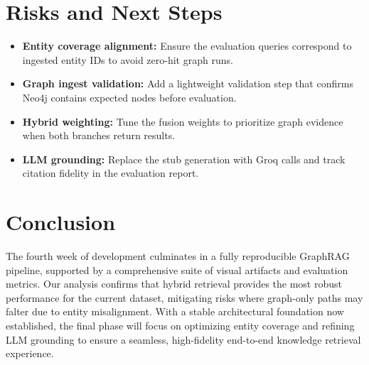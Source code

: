 \documentclass[11pt,a4paper]{article}
\begin{document}
\section{Risks and Next Steps}
\begin{itemize}
    \item \textbf{Entity coverage alignment:} Ensure the evaluation queries correspond to ingested entity IDs to avoid zero-hit graph runs.
    \item \textbf{Graph ingest validation:} Add a lightweight validation step that confirms Neo4j contains expected nodes before evaluation.
    \item \textbf{Hybrid weighting:} Tune the fusion weights to prioritize graph evidence when both branches return results.
    \item \textbf{LLM grounding:} Replace the stub generation with Groq calls and track citation fidelity in the evaluation report.
\end{itemize}

\section{Conclusion}
The fourth week of development culminates in a fully reproducible GraphRAG pipeline, supported by a comprehensive suite of visual artifacts and evaluation metrics. Our analysis confirms that hybrid retrieval provides the most robust performance for the current dataset, mitigating risks where graph-only paths may falter due to entity misalignment. With a stable architectural foundation now established, the final phase will focus on optimizing entity coverage and refining LLM grounding to ensure a seamless, high-fidelity end-to-end knowledge retrieval experience.
\end{document}
